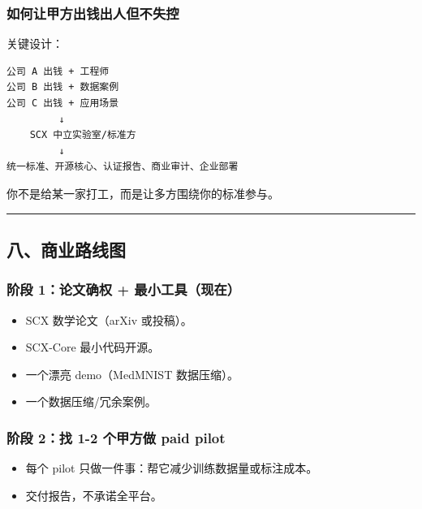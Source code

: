 \documentclass[
  12pt,
]{ctexart}
\providecommand{\tightlist}{%
  \setlength{\itemsep}{0pt}\setlength{\parskip}{0pt}}
\begin{document}
\subsubsection{如何让甲方出钱出人但不失控}\label{ux5982ux4f55ux8ba9ux7532ux65b9ux51faux94b1ux51faux4ebaux4f46ux4e0dux5931ux63a7}

关键设计：

\begin{verbatim}
公司 A 出钱 + 工程师
公司 B 出钱 + 数据案例
公司 C 出钱 + 应用场景
         ↓
    SCX 中立实验室/标准方
         ↓
统一标准、开源核心、认证报告、商业审计、企业部署
\end{verbatim}

你不是给某一家打工，而是让多方围绕你的标准参与。

\begin{center}\rule{0.5\linewidth}{0.5pt}\end{center}

\subsection{八、商业路线图}\label{ux516bux5546ux4e1aux8defux7ebfux56fe}

\subsubsection{阶段 1：论文确权 +
最小工具（现在）}\label{ux9636ux6bb5-1ux8bbaux6587ux786eux6743-ux6700ux5c0fux5de5ux5177ux73b0ux5728}

\begin{itemize}
\tightlist
\item
  SCX 数学论文（arXiv 或投稿）。
\item
  SCX-Core 最小代码开源。
\item
  一个漂亮 demo（MedMNIST 数据压缩）。
\item
  一个数据压缩/冗余案例。
\end{itemize}

\subsubsection{阶段 2：找 1-2 个甲方做 paid
pilot}\label{ux9636ux6bb5-2ux627e-1-2-ux4e2aux7532ux65b9ux505a-paid-pilot}

\begin{itemize}
\tightlist
\item
  每个 pilot 只做一件事：帮它减少训练数据量或标注成本。
\item
  交付报告，不承诺全平台。
\end{itemize}
\end{document}
